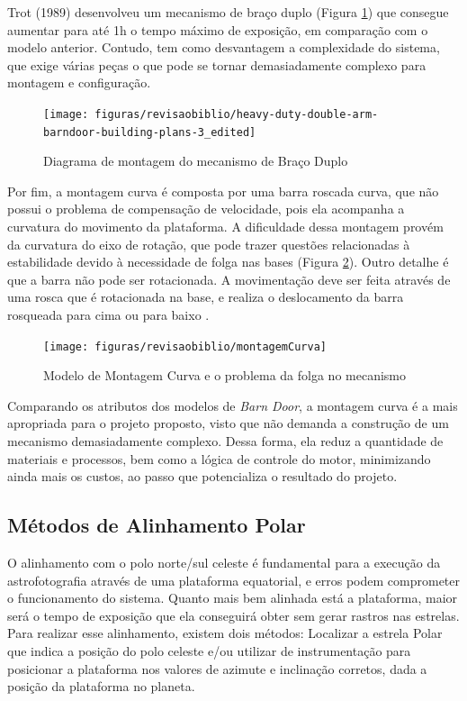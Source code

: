 Trot (1989) desenvolveu um mecanismo de braço duplo (Figura \ref{fig:doublearm}) que consegue aumentar para até 1h o tempo máximo de exposição, em comparação com o modelo anterior. Contudo, tem como desvantagem a complexidade do sistema, que exige várias peças o que pode se tornar demasiadamente complexo para montagem e configuração.

\begin{figure}[!htb]
	\centering
	\caption{Diagrama de montagem do mecanismo de Braço Duplo}
	\texttt{[image: figuras/revisaobiblio/heavy-duty-double-arm-barndoor-building-plans-3\_edited]}
	\label{fig:doublearm}
\end{figure}

Por fim, a montagem curva é composta por uma barra roscada curva, que não possui o problema de compensação de velocidade, pois ela acompanha a curvatura do movimento da plataforma. A dificuldade dessa montagem provém da curvatura do eixo de rotação, que pode trazer questões relacionadas à estabilidade devido à necessidade de folga nas bases (Figura \ref{fig:montagemCurva}). Outro detalhe é que a barra não pode ser rotacionada. A movimentação deve ser feita através de uma rosca que é rotacionada na base, e realiza o deslocamento da barra rosqueada para cima ou para baixo \cite{site:pentaxBarnDoor}.  

 
 \begin{figure}[!htb]
 	\centering
 	\caption[Modelo de Montagem Curva]{Modelo de Montagem Curva e o problema da folga no mecanismo}
 	\texttt{[image: figuras/revisaobiblio/montagemCurva]}
 	\label{fig:montagemCurva}
 \end{figure}

Comparando os atributos dos modelos de \textit{Barn Door}, a montagem curva é a mais apropriada para o projeto proposto, visto que não demanda a construção de um mecanismo demasiadamente complexo. Dessa forma, ela reduz a quantidade de materiais e processos, bem como a lógica de controle do motor, minimizando ainda mais os custos, ao passo que potencializa o resultado do projeto. 

\subsection{Métodos de Alinhamento Polar}
O alinhamento com o polo norte/sul celeste é fundamental para a execução da astrofotografia através de uma plataforma equatorial, e erros podem comprometer o funcionamento do sistema. Quanto mais bem alinhada está a plataforma, maior será o tempo de exposição que ela conseguirá obter sem gerar rastros nas estrelas. Para realizar esse alinhamento, existem dois métodos: Localizar a estrela Polar que indica a posição do polo celeste e/ou utilizar de instrumentação para posicionar a plataforma nos valores de azimute e inclinação corretos, dada a posição da plataforma no planeta.

